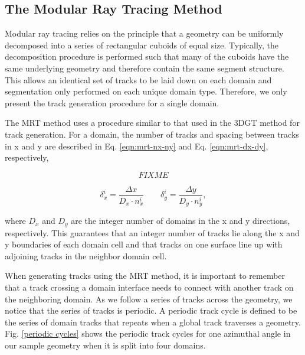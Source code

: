 \subsection{The Modular Ray Tracing Method}

Modular ray tracing relies on the principle that a geometry can be uniformly decomposed into a series of rectangular cuboids of equal size. Typically, the decomposition procedure is performed such that many of the cuboids have the same underlying geometry and therefore contain the same segment structure. This allows an identical set of tracks to be laid down on each domain and segmentation only performed on each unique domain type. Therefore, we only present the track generation procedure for a single domain. 

The MRT method uses a procedure similar to that used in the 3DGT method for track generation. For a domain, the number of tracks and spacing between tracks in x and y are described in Eq. \ref{eqn:mrt-nx-ny} and Eq. \ref{eqn:mrt-dx-dy}, respectively,

\begin{equation}
FIXME
\label{eqn:mrt-nx-ny}
\end{equation}

\begin{equation}
\delta_x^i = \frac{\Delta x}{D_x \cdot n_x^i} \qquad \delta_y^i = \frac{\Delta y}{D_y \cdot n_y^i},
\label{eqn:mrt-dx-dy}
\end{equation}

\noindent
where $D_x$ and $D_y$ are the integer number of domains in the x and y directions, respectively. This guarantees that an integer number of tracks lie along the x and y boundaries of each domain cell and that tracks on one surface line up with adjoining tracks in the neighbor domain cell. 

When generating tracks using the MRT method, it is important to remember that a track crossing a domain interface needs to connect with another track on the neighboring domain. As we follow a series of tracks across the geometry, we notice that the series of tracks is periodic. A periodic track cycle is defined to be the series of domain tracks that repeats when a global track traverses a geometry. Fig. \ref{periodic cycles} shows the periodic track cycles for one azimuthal angle in our sample geometry when it is split into four domains.

